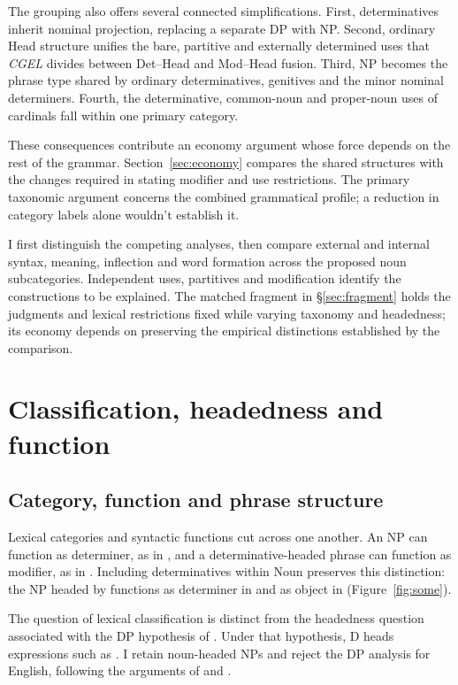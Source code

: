 \documentclass[12pt]{article}
\begin{document}
The grouping also offers several connected simplifications. First, determinatives inherit nominal projection, replacing a separate DP with NP. Second, ordinary Head structure unifies the bare, partitive and externally determined uses that \textit{CGEL} divides between Det--Head and Mod--Head fusion. Third, NP becomes the phrase type shared by ordinary determinatives, genitives and the minor nominal determiners. Fourth, the determinative, common-noun and proper-noun uses of cardinals fall within one primary category.

These consequences contribute an economy argument whose force depends on the rest of the grammar. Section~\ref{sec:economy} compares the shared structures with the changes required in stating modifier and use restrictions. The primary taxonomic argument concerns the combined grammatical profile; a reduction in category labels alone wouldn't establish it.

I first distinguish the competing analyses, then compare external and internal syntax, meaning, inflection and word formation across the proposed noun subcategories. Independent uses, partitives and modification identify the constructions to be explained. The matched fragment in §\ref{sec:fragment} holds the judgments and lexical restrictions fixed while varying taxonomy and headedness; its economy depends on preserving the empirical distinctions established by the comparison.

\section{Classification, headedness and function}\label{sec:alternatives}

\subsection{Category, function and phrase structure}\label{sec:category-function}

Lexical categories and syntactic functions cut across one another. An NP can function as determiner, as in , and a determinative-headed phrase can function as modifier, as in  \citep{payne2010,pullummiller2022nps}. Including determinatives within Noun preserves this distinction: the NP headed by  functions as determiner in  and as object in  (Figure~\ref{fig:some}).

The question of lexical classification is distinct from the headedness question associated with the DP hypothesis of \textcite{abney1987}. Under that hypothesis, D heads expressions such as . I retain noun-headed NPs and reject the DP analysis for English, following the arguments of \textcite{pullummiller2022nps} and \textcite{bruening2020nominal}.
\end{document}
